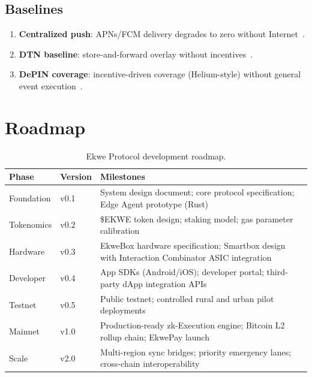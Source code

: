 \documentclass[11pt,a4paper]{article}
\begin{document}
\subsection{Baselines}
\begin{enumerate}[nosep]
  \item \textbf{Centralized push}: APNs/FCM delivery degrades to zero without Internet~\cite{apns}.
  \item \textbf{DTN baseline}: store-and-forward overlay without incentives~\cite{rfc4838}.
  \item \textbf{DePIN coverage}: incentive-driven coverage (Helium-style) without general event execution~\cite{helium}.
\end{enumerate}

\section{Roadmap}

\begin{table}[H]
\centering
\caption{Ekwe Protocol development roadmap.}
\label{tab:roadmap}
\begin{tabular}{@{}llp{8cm}@{}}
\toprule
\textbf{Phase} & \textbf{Version} & \textbf{Milestones} \\
\midrule
Foundation & v0.1 & System design document; core protocol specification; Edge Agent prototype (Rust) \\
Tokenomics & v0.2 & \$EKWE token design; staking model; gas parameter calibration \\
Hardware & v0.3 & EkweBox hardware specification; Smartbox design with Interaction Combinator ASIC integration \\
Developer & v0.4 & App SDKs (Android/iOS); developer portal; third-party dApp integration APIs \\
Testnet & v0.5 & Public testnet; controlled rural and urban pilot deployments \\
Mainnet & v1.0 & Production-ready zk-Execution engine; Bitcoin L2 rollup chain; EkwePay launch \\
Scale & v2.0 & Multi-region sync bridges; priority emergency lanes; cross-chain interoperability \\
\bottomrule
\end{tabular}
\end{table}

\end{document}
